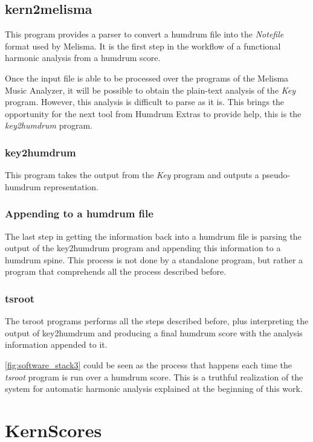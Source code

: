  \subsection{kern2melisma}
    This program provides a parser to convert a humdrum file into the \emph{Notefile} format used by Melisma. It is the first step in the workflow of a functional harmonic analysis from a humdrum score.

  Once the input file is able to be processed over the programs of the Melisma Music Analyzer, it will be possible to obtain the plain-text analysis of the \emph{Key} program. However, this analysis is difficult to parse as it is. This brings the opportunity for the next tool from Humdrum Extras to provide help, this is the \emph{key2humdrum} program.

  \subsubsection{key2humdrum}
    This program takes the output from the \emph{Key} program and outputs a pseudo-humdrum representation.

  \subsubsection{Appending to a humdrum file}
    The last step in getting the information back into a humdrum file is parsing the output of the key2humdrum program and appending this information to a humdrum spine. This process is not done by a standalone program, but rather a program that comprehends all the process described before.

  \subsubsection{tsroot}
    The tsroot programs performs all the steps described before, plus interpreting the output of key2humdrum and producing a final humdrum score with the analysis information appended to it.

    \autoref{fig:software_stack3} could be seen as the process that happens each time the \emph{tsroot} program is run over a humdrum score. This is a truthful realization of the system for automatic harmonic analysis explained at the beginning of this work.
    
\section{KernScores}
